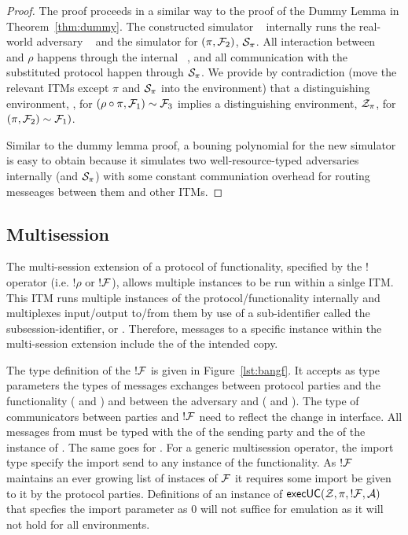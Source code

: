 \begin{proof}
The proof proceeds in a similar way to the proof of the Dummy Lemma in Theorem~\ref{thm:dummy}. 
The constructed simulator \Simulator~ internally runs the real-world adversary \Adversary~ and the simulator for $(\pi, \mathcal{F}_2)$, $\mathcal{S}_\pi$. 
All interaction between \Environment~ and $\rho$ happens through the internal \Adversary~, and all communication with the substituted protocol happen through $\mathcal{S}_\pi$. 
We provide by contradiction (move the relevant ITMs except $\pi$ and $\mathcal{S}_\pi$ into the environment) that a distinguishing environment, \Environment, for $(\rho \circ \pi, \mathcal{F}_1) \sim \mathcal{F}_3$ implies a distinguishing environment, $\mathcal{Z}_\pi$, for $(\pi, \mathcal{F}_2) \sim \mathcal{F}_1)$. 

Similar to the dummy lemma proof, a bouning polynomial for the new simulator \Simulator is easy to obtain because it simulates two well-resource-typed adversaries internally (\Adversary and $\mathcal{S}_\pi$) with some constant communiation overhead for routing messeages between them and other ITMs. 
\end{proof}

\subsection{Multisession}
The multi-session extension of a protocol of functionality, specified by the $!$ operator (i.e. $!\rho$ or $!\mathcal{F}$), allows multiple instances to be run within a sinlge ITM.
This ITM runs multiple instances of the protocol/functionality internally and multiplexes input/output to/from them by use of a sub-identifier called the subsession-identifier, or .
Therefore, messages to a specific instance within the multi-session extension include the  of the intended copy. 

The type definition of the $!\mathcal{F}$ is given in Figure~\ref{lst:bangf}. 
It accepts as type parameters the types of messages exchanges between protocol parties and the functionality ( and ) and between the adversary and \F ( and ). 
The type of communicators between parties and $!\mathcal{F}$ need to reflect the change in interface. 
All messages from  must be typed with the  of the sending party and the  of the instance of \F. 
The same goes for \F. 
For a generic multisession operator, the import type specify the import send to any instance of the functionality.
As $!\mathcal{F}$ maintains an ever growing list of instaces of $\mathcal{F}$ it requires some import be given to it by the protocol parties. 
Definitions of an instance of ${\mathsf {execUC}}(\mathcal{Z}, \pi, !\mathcal{F}, \mathcal{A})$ that specfies the import parameter  as 0 will not suffice for emulation as it will not hold for all environments. 

